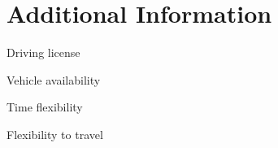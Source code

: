 \section{Additional Information}

\begin{extralist}
	\item{Driving license}
	\item{Vehicle availability}
	\item{Time flexibility}
	\item{Flexibility to travel}
\end{extralist}

